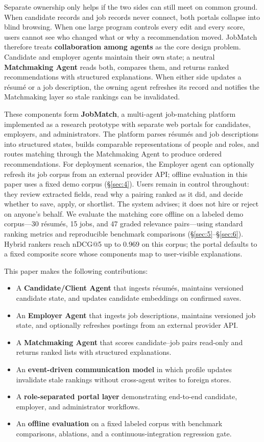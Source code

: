 Separate ownership only helps if the two sides can still meet on common ground.
When candidate records and job records never connect, both portals collapse into blind browsing.
When one large program controls every edit and every score, users cannot see who changed what or why a recommendation moved.
JobMatch therefore treats \textbf{collaboration among agents} as the core design problem.
Candidate and employer agents maintain their own state; a neutral \textbf{Matchmaking Agent} reads both, compares them, and returns ranked recommendations with structured explanations.
When either side updates a résumé or a job description, the owning agent refreshes its record and notifies the Matchmaking layer so stale rankings can be invalidated.

These components form \textbf{JobMatch}, a multi-agent job-matching platform implemented as a research prototype with separate web portals for candidates, employers, and administrators.
The platform parses résumés and job descriptions into structured states, builds comparable representations of people and roles, and routes matching through the Matchmaking Agent to produce ordered recommendations.
For deployment scenarios, the Employer agent can optionally refresh its job corpus from an external provider API; offline evaluation in this paper uses a fixed demo corpus (\S\ref{sec:4}).
Users remain in control throughout: they review extracted fields, read why a pairing ranked as it did, and decide whether to save, apply, or shortlist.
The system advises; it does not hire or reject on anyone's behalf.
We evaluate the matching core offline on a labeled demo corpus---30 résumés, 15 jobs, and 47 graded relevance pairs---using standard ranking metrics and reproducible benchmark comparisons (\S\ref{sec:5}--\S\ref{sec:6}).
Hybrid rankers reach nDCG@5 up to $0.969$ on this corpus; the portal defaults to a fixed composite score whose components map to user-visible explanations.

This paper makes the following contributions:
\begin{itemize}[noitemsep]
  \item A \textbf{Candidate/Client Agent} that ingests résumés, maintains versioned candidate state, and updates candidate embeddings on confirmed saves.
  \item An \textbf{Employer Agent} that ingests job descriptions, maintains versioned job state, and optionally refreshes postings from an external provider API.
  \item A \textbf{Matchmaking Agent} that scores candidate--job pairs read-only and returns ranked lists with structured explanations.
  \item An \textbf{event-driven communication model} in which profile updates invalidate stale rankings without cross-agent writes to foreign stores.
  \item A \textbf{role-separated portal layer} demonstrating end-to-end candidate, employer, and administrator workflows.
  \item An \textbf{offline evaluation} on a fixed labeled corpus with benchmark comparisons, ablations, and a continuous-integration regression gate.
\end{itemize}

